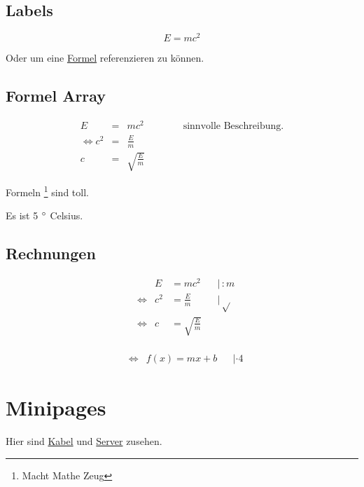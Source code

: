\section{Labels}
\begin{equation}
    \label{eq:einstein}
    E = mc^2
\end{equation}

Oder um eine \hyperref[eq:einstein]{Formel} referenzieren zu können.

\section{Formel Array}

\begin{eqnarray}
    E &=& mc^2 \qquad \qquad \text{sinnvolle Beschreibung.} \\
    \Leftrightarrow c^2 &=& \frac{E}{m} \\
    c &=& \sqrt{\frac{E}{m}}
\end{eqnarray}

Formeln \footnote{Macht Mathe Zeug} sind toll.


Es ist 5 $\degree$ Celsius.

\section{Rechnungen}
\begin{align*}
     &                 & E   & = mc^2               &  & |\, :m      \\
     & \Leftrightarrow & c^2 & = \frac{E}{m}        &  & |\, \sqrt{} \\
     & \Leftrightarrow & c   & = \sqrt{\frac{E}{m}}                  \\
\end{align*}

\begin{align*}
     & \Leftrightarrow & f(x)=mx+b &  & | \cdot 4
\end{align*}

\chapter{Minipages}

Hier sind  \hyperref[fig:kabel]{Kabel} und \hyperref[fig:server]{Server} zusehen.


